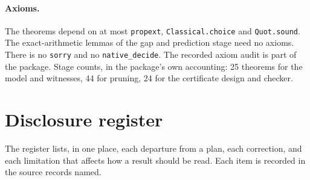 \documentclass[11pt,a4paper]{article}
\theoremstyle{plain}
\theoremstyle{definition}
\theoremstyle{remark}
\newcommand{\lean}[1]{\nolinkurl{#1}}
\begin{document}
\paragraph{Axioms.} The theorems depend on at most \lean{propext}, \lean{Classical.choice} and \lean{Quot.sound}. The exact-arithmetic lemmas of the gap and prediction stage need no axioms. There is no \lean{sorry} and no \lean{native_decide}. The recorded axiom audit is part of the package. Stage counts, in the package's own accounting: 25 theorems for the model and witnesses, 44 for pruning, 24 for the certificate design and checker.

\section{Disclosure register}\label{app:disc}

The register lists, in one place, each departure from a plan, each correction, and each limitation that affects how a result should be read. Each item is recorded in the source records named.
\end{document}
